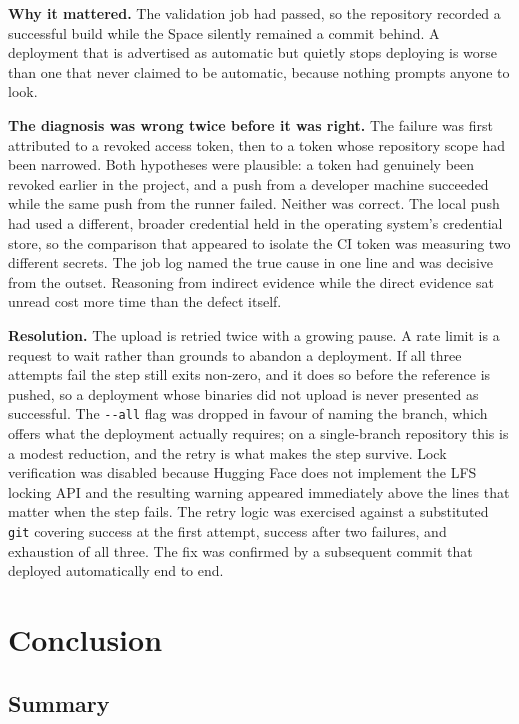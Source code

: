 \documentclass[11pt,a4paper]{report}
\begin{document}
\textbf{Why it mattered.} The validation job had passed, so the repository
recorded a successful build while the Space silently remained a commit behind.
A deployment that is advertised as automatic but quietly stops deploying is
worse than one that never claimed to be automatic, because nothing prompts
anyone to look.

\textbf{The diagnosis was wrong twice before it was right.} The failure was
first attributed to a revoked access token, then to a token whose repository
scope had been narrowed. Both hypotheses were plausible: a token had genuinely
been revoked earlier in the project, and a push from a developer machine
succeeded while the same push from the runner failed. Neither was correct. The
local push had used a different, broader credential held in the operating
system's credential store, so the comparison that appeared to isolate the CI
token was measuring two different secrets. The job log named the true cause in
one line and was decisive from the outset. Reasoning from indirect evidence
while the direct evidence sat unread cost more time than the defect itself.

\textbf{Resolution.} The upload is retried twice with a growing pause. A rate
limit is a request to wait rather than grounds to abandon a deployment. If all
three attempts fail the step still exits non-zero, and it does so before the
reference is pushed, so a deployment whose binaries did not upload is never
presented as successful. The \texttt{-{}-all} flag was dropped in favour of
naming the branch, which offers what the deployment actually requires; on a
single-branch repository this is a modest reduction, and the retry is what makes
the step survive. Lock verification was disabled because Hugging Face does not
implement the LFS locking API and the resulting warning appeared immediately
above the lines that matter when the step fails. The retry logic was exercised
against a substituted \texttt{git} covering success at the first attempt,
success after two failures, and exhaustion of all three. The fix was confirmed
by a subsequent commit that deployed automatically end to end.

\chapter{Conclusion}

\section{Summary}
\end{document}
